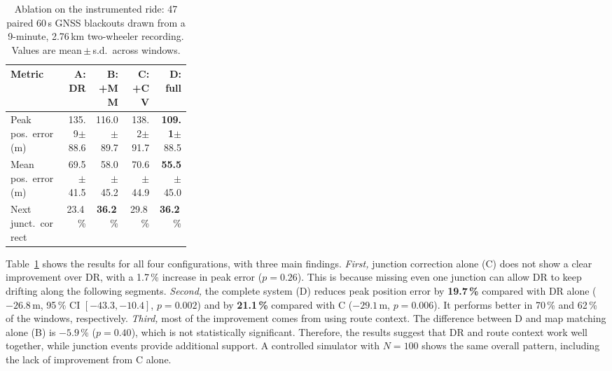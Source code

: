 \documentclass[conference]{IEEEtran}
\begin{document}
\begin{table}[t]
\centering
\caption{Ablation on the instrumented ride: 47 paired 60\,s GNSS blackouts drawn from a 9-minute, 2.76\,km two-wheeler recording. Values are mean\,$\pm$\,s.d.\ across windows.}
\label{tab:quant}
\setlength{\tabcolsep}{2pt}
\begin{tabular}{@{}p{0.30\linewidth}rrrr@{}}
\toprule
\textbf{Metric} & \textbf{A: DR} & \textbf{B: +MM} & \textbf{C: +CV} & \textbf{D: full}\\
\midrule
Peak pos.\ error (m)   & 135.9\scriptsize{$\pm$88.6} & 116.0\scriptsize{$\pm$89.7} & 138.2\scriptsize{$\pm$91.7} & \textbf{109.1}\scriptsize{$\pm$88.5}\\
Mean pos.\ error (m)   & 69.5\scriptsize{$\pm$41.5}  & 58.0\scriptsize{$\pm$45.2}  & 70.6\scriptsize{$\pm$44.9}  & \textbf{55.5}\scriptsize{$\pm$45.0}\\
Next junct.\ correct & 23.4\,\% & \textbf{36.2}\,\% & 29.8\,\% & \textbf{36.2}\,\%\\
\bottomrule
\end{tabular}
\end{table}


Table~\ref{tab:quant} shows the results for all four configurations, with three main findings. \emph{First,} junction correction alone (C) does not show a clear improvement over DR, with a 1.7\,\% increase in peak error ($p{=}0.26$). This is because missing even one junction can allow DR to keep drifting along the following segments. \emph{Second,} the complete system (D) reduces peak position error by \textbf{19.7\,\%} compared with DR alone ($-26.8$\,m, 95\,\% CI $[-43.3,-10.4]$, $p{=}0.002$) and by \textbf{21.1\,\%} compared with C ($-29.1$\,m, $p{=}0.006$). It performs better in 70\,\% and 62\,\% of the windows, respectively. \emph{Third,} most of the improvement comes from using route context. The difference between D and map matching alone (B) is $-5.9$\,\% ($p{=}0.40$), which is not statistically significant. Therefore, the results suggest that DR and route context work well together, while junction events provide additional support. A controlled simulator with $N{=}100$ shows the same overall pattern, including the lack of improvement from C alone.
\end{document}
